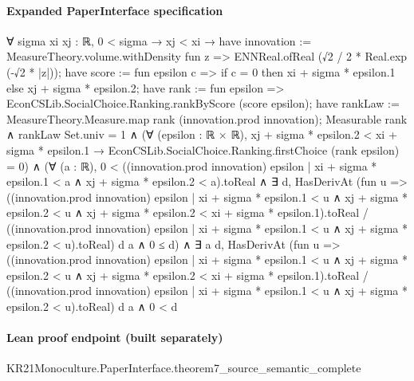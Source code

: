 \documentclass[10pt]{article}
\begin{document}
\paragraph{Expanded PaperInterface specification}
\begin{ReviewVerbatim}
∀ {sigma xi xj : ℝ},
  0 < sigma →
    xj < xi →
      have innovation := MeasureTheory.volume.withDensity fun z => ENNReal.ofReal (√2 / 2 * Real.exp (-√2 * |z|));
      have score := fun epsilon c => if c = 0 then xi + sigma * epsilon.1 else xj + sigma * epsilon.2;
      have rank := fun epsilon => EconCSLib.SocialChoice.Ranking.rankByScore (score epsilon);
      have rankLaw := MeasureTheory.Measure.map rank (innovation.prod innovation);
      Measurable rank ∧
        rankLaw Set.univ = 1 ∧
          (∀ (epsilon : ℝ × ℝ),
              xj + sigma * epsilon.2 < xi + sigma * epsilon.1 →
                EconCSLib.SocialChoice.Ranking.firstChoice (rank epsilon) = 0) ∧
            (∀ (a : ℝ),
                0 <
                    ((innovation.prod innovation)
                        {epsilon | xi + sigma * epsilon.1 < a ∧ xj + sigma * epsilon.2 < a}).toReal ∧
                  ∃ d,
                    HasDerivAt
                        (fun u =>
                          ((innovation.prod innovation)
                                {epsilon |
                                  xi + sigma * epsilon.1 < u ∧
                                    xj + sigma * epsilon.2 < u ∧
                                      xj + sigma * epsilon.2 < xi + sigma * epsilon.1}).toReal /
                            ((innovation.prod innovation)
                                {epsilon | xi + sigma * epsilon.1 < u ∧ xj + sigma * epsilon.2 < u}).toReal)
                        d a ∧
                      0 ≤ d) ∧
              ∃ a d,
                HasDerivAt
                    (fun u =>
                      ((innovation.prod innovation)
                            {epsilon |
                              xi + sigma * epsilon.1 < u ∧
                                xj + sigma * epsilon.2 < u ∧ xj + sigma * epsilon.2 < xi + sigma * epsilon.1}).toReal /
                        ((innovation.prod innovation)
                            {epsilon | xi + sigma * epsilon.1 < u ∧ xj + sigma * epsilon.2 < u}).toReal)
                    d a ∧
                  0 < d
\end{ReviewVerbatim}

\paragraph{Lean proof endpoint (built separately)}\begin{ReviewVerbatim}
KR21Monoculture.PaperInterface.theorem7_source_semantic_complete
\end{ReviewVerbatim}
\end{document}
